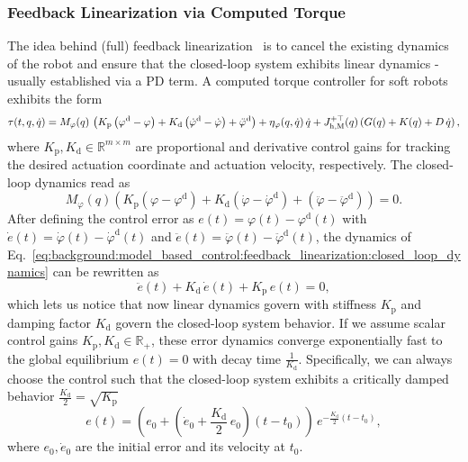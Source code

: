 \subsubsection{Feedback Linearization via Computed Torque}
The idea behind (full) feedback linearization~\citep{slotine1987on, spong2020robot} is to 
cancel the existing dynamics of the robot and ensure that the closed-loop system exhibits linear dynamics - usually established via a PD term. A computed torque controller for soft robots exhibits the form
\begin{equation}\small
    \tau(t,q,\dot{q}) = M_{\varphi}(q) \, \left (K_\mathrm{p} \left (\varphi^\mathrm{d} - \varphi \right ) + K_\mathrm{d} \left (\dot{\varphi}^\mathrm{d} - \dot{\varphi} \right ) + \ddot{\varphi}^\mathrm{d}\right ) + \eta_{\varphi}(q,\dot{q}) \, \dot{q} + J_{\mathrm{h},\mathrm{M}}^{+\top}(q) \left ( G(q) + K(q) + D \, \dot{q} \right ),
\end{equation}
where $K_\mathrm{p}, K_\mathrm{d} \in \mathbb{R}^{m \times m}$ are proportional and derivative control gains for tracking the desired actuation coordinate and actuation velocity, respectively. 
The closed-loop dynamics read as
\begin{equation}\label{eq:background:model_based_control:feedback_linearization:closed_loop_dynamics}
    M_{\varphi}(q) \left (K_\mathrm{p} \left (\varphi - \varphi^\mathrm{d} \right ) + K_\mathrm{d} \left (\dot{\varphi} - \dot{\varphi}^\mathrm{d} \right ) + \left ( \ddot{\varphi} - \ddot{\varphi}^\mathrm{d} \right ) \right ) = 0.
\end{equation}
After defining the control error as $e(t) = \varphi(t) - \varphi^\mathrm{d}(t)$ with $\dot{e}(t) = \dot{\varphi}(t) - \dot{\varphi}^\mathrm{d}(t)$ and $\ddot{e}(t) = \ddot{\varphi}(t) - \ddot{\varphi}^\mathrm{d}(t)$, the dynamics of Eq.~\ref{eq:background:model_based_control:feedback_linearization:closed_loop_dynamics} can be rewritten as
\begin{equation}
    \ddot{e}(t) + K_\mathrm{d} \, \dot{e}(t) + K_\mathrm{p} \, e(t) = 0,
\end{equation}
which lets us notice that now linear dynamics govern with stiffness $K_\mathrm{p}$ and damping factor $K_\mathrm{d}$ govern the closed-loop system behavior.
If we assume scalar control gains $K_\mathrm{p}, K_\mathrm{d} \in \mathbb{R}_+$, these error dynamics converge exponentially fast to the global equilibrium $e(t) = 0$ with decay time $\frac{1}{K_\mathrm{d}}$. Specifically, we can always choose the control such that the closed-loop system exhibits a critically damped behavior $\frac{K_\mathrm{d}}{2} = \sqrt{K_\mathrm{p}}$
\begin{equation}\label{eq:background:model_based_control:feedback_linearization:error_evolution_closed_form}
    e(t) = \left ( e_0 + \left ( \dot{e}_0 + \frac{K_\mathrm{d}}{2} \, e_0 \right ) (t-t_0) \right ) \, e^{-\frac{K_\mathrm{d}}{2} (t - t_0)},
\end{equation}
where $e_0, \dot{e}_0$ are the initial error and its velocity at $t_0$.


